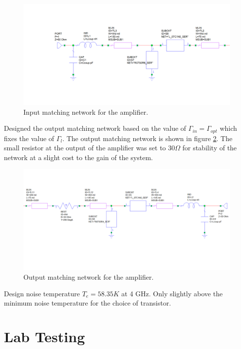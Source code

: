 \documentclass[twocolumn, aps, apl]{revtex4-1}
\begin{document}
    \begin{figure}[!htbp]
    \centering
    \includegraphics[scale=0.35]{input_net.png}
    \caption{Input matching network for the amplifier.}
    \label{fig:inputnet}
    \end{figure}

Designed the output matching network based on the value of $\Gamma_{in} = \Gamma_{opt}$ which fixes the value of $\Gamma_l$. The output matching network is shown in figure \ref{fig:outputnet}. The small resistor at the output of the amplifier was set to $30 \Omega$ for stability of the network at a slight cost to the gain of the system.

    \begin{figure}[!htbp]
    \centering
    \includegraphics[scale=0.35]{output_net.png}
    \caption{Output matching network for the amplifier.}
    \label{fig:outputnet}
    \end{figure}

Design noise temperature $T_e = 58.35 K$ at 4 GHz. Only slightly above the minimum noise temperature for the choice of transistor.

\FloatBarrier

\section*{Lab Testing}
\end{document}
